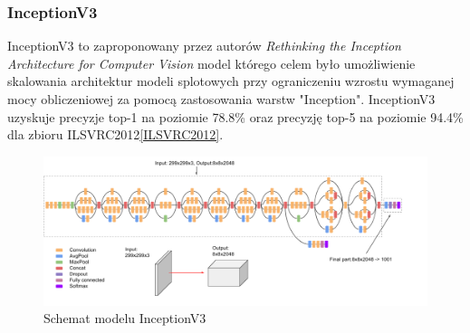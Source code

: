 \documentclass[
    left=2.5cm,         %
    right=2.5cm,        %
    top=2.5cm,          %
    bottom=3cm,         %
    bindingoffset=6mm,  %
    nohyphenation=false %
]{eiti/eiti-thesis}
\begin{document}
        \subsubsection{InceptionV3}
            InceptionV3 to zaproponowany przez autorów
            \textit{Rethinking the Inception Architecture for Computer Vision}\cite{DBLP:journals/corr/SzegedyVISW15}
            model którego celem było umożliwienie skalowania architektur modeli splotowych przy ograniczeniu wzrostu
            wymaganej mocy obliczeniowej za pomocą zastosowania warstw "Inception".
            InceptionV3 uzyskuje precyzje top-1 na poziomie 78.8\% oraz precyzję top-5 na
            poziomie 94.4\% dla zbioru ILSVRC2012\ref{ILSVRC2012}.
            \begin{figure}[H]
            \centring
            \includegraphics[width=\textwidth]{eiti/inceptionv3overview.png}
            \caption{Schemat modelu InceptionV3}
            \end{figure}
\end{document}

